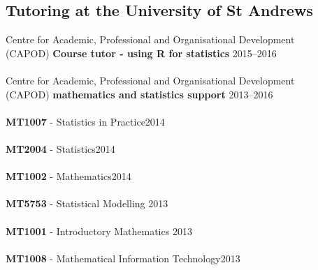 \documentclass[10pt,letter]{article}
\begin{document}
\vspace{1mm}
 \subsection*{Tutoring at the University of St Andrews}
 \vspace{1mm}
 
 Centre for Academic, Professional and Organisational Development\\ (CAPOD) \textbf{Course tutor - using R for statistics} \hfill{2015--2016}\\
 \hdashrule[0.5ex]{4cm}{1pt}{1pt}\\
  Centre for Academic, Professional and Organisational Development\\ (CAPOD) \textbf{mathematics and statistics support} \hfill{2013--2016}\\
 \hdashrule[0.5ex]{4cm}{1pt}{1pt}\\
\textbf{MT1007} -  Statistics in Practice\hfill{2014}\\
 \hdashrule[0.5ex]{4cm}{1pt}{1pt}\\
  \textbf{MT2004} -  Statistics\hfill{2014}\\
 \hdashrule[0.5ex]{4cm}{1pt}{1pt}\\
  \textbf{MT1002} -  Mathematics\hfill{2014}\\
 \hdashrule[0.5ex]{4cm}{1pt}{1pt}\\
 \textbf{MT5753} -  Statistical Modelling \hfill{2013}\\
 \hdashrule[0.5ex]{4cm}{1pt}{1pt}\\
\textbf{MT1001} -  Introductory Mathematics \hfill{2013}\\
 \hdashrule[0.5ex]{4cm}{1pt}{1pt}\\
 \textbf{MT1008} -  Mathematical Information Technology\hfill{2013}\\

 \newpage
\end{document}
